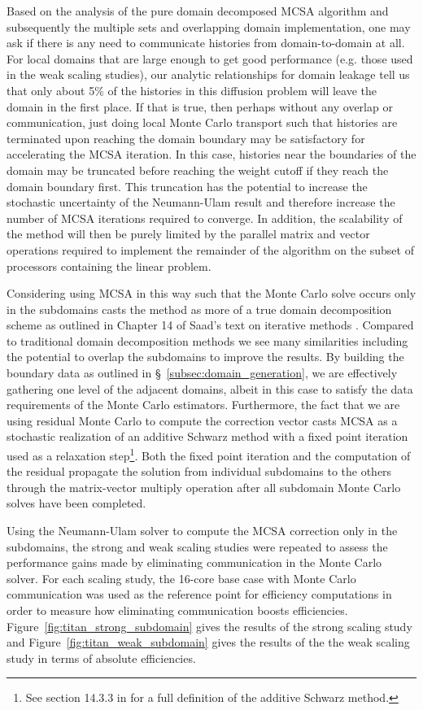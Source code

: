 Based on the analysis of the pure domain decomposed MCSA algorithm and
subsequently the multiple sets and overlapping domain implementation,
one may ask if there is any need to communicate histories from
domain-to-domain at all. For local domains that are large enough to
get good performance (e.g. those used in the weak scaling studies),
our analytic relationships for domain leakage tell us that only about
5\% of the histories in this diffusion problem will leave the domain
in the first place.  If that is true, then perhaps without any overlap
or communication, just doing local Monte Carlo transport such that
histories are terminated upon reaching the domain boundary may be
satisfactory for accelerating the MCSA iteration. In this case,
histories near the boundaries of the domain may be truncated before
reaching the weight cutoff if they reach the domain boundary
first. This truncation has the potential to increase the stochastic
uncertainty of the Neumann-Ulam result and therefore increase the
number of MCSA iterations required to converge. In addition, the
scalability of the method will then be purely limited by the parallel
matrix and vector operations required to implement the remainder of
the algorithm on the subset of processors containing the linear
problem.

Considering using MCSA in this way such that the Monte Carlo solve
occurs only in the subdomains casts the method as more of a true
domain decomposition scheme as outlined in Chapter 14 of Saad's text
on iterative methods \cite{saad_iterative_2003}. Compared to
traditional domain decomposition methods we see many similarities
including the potential to overlap the subdomains to improve the
results. By building the boundary data as outlined in
\S~\ref{subsec:domain_generation}, we are effectively gathering one
level of the adjacent domains, albeit in this case to satisfy the data
requirements of the Monte Carlo estimators. Furthermore, the fact that
we are using residual Monte Carlo to compute the correction vector
casts MCSA as a stochastic realization of an additive Schwarz method
with a fixed point iteration used as a relaxation step\footnote{See
  section 14.3.3 in \cite{saad_iterative_2003} for a full definition
  of the additive Schwarz method.}. Both the fixed point iteration and
the computation of the residual propagate the solution from individual
subdomains to the others through the matrix-vector multiply operation
after all subdomain Monte Carlo solves have been completed.

Using the Neumann-Ulam solver to compute the MCSA correction only in
the subdomains, the strong and weak scaling studies were repeated to
assess the performance gains made by eliminating communication in the
Monte Carlo solver. For each scaling study, the 16-core base case with
Monte Carlo communication was used as the reference point for
efficiency computations in order to measure how eliminating
communication boosts
efficiencies. Figure~\ref{fig:titan_strong_subdomain} gives the
results of the strong scaling study and
Figure~\ref{fig:titan_weak_subdomain} gives the results of the the
weak scaling study in terms of absolute efficiencies.

